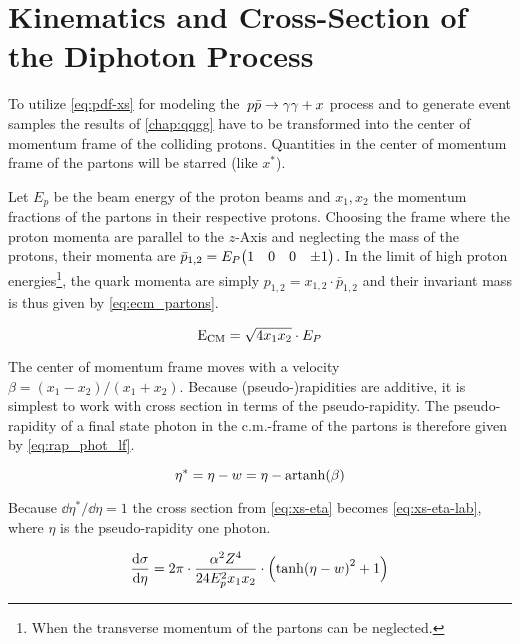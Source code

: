 \section{Kinematics and Cross-Section of the Diphoton Process}%
\label{sec:lab_xs}

To utilize \cref{eq:pdf-xs} for modeling the~\(p\bar{p}\rightarrow\gamma\gamma + x\) process and to
generate event samples the results of \cref{chap:qqgg} have to be
transformed into the center of momentum frame of the colliding
protons. Quantities in the center of momentum frame of the partons
will be starred (like \(x^\ast\)).

Let \(E_p\) be the beam energy of the proton beams and \(x_1, x_2\)
the momentum fractions of the partons in their respective protons.
Choosing the frame where the proton momenta are parallel to the
\(z\)-Axis and neglecting the mass of the protons, their momenta are
\(\bar{p}_{1,2} = E_P \mqty(1 & 0 & 0 & \pm1)\). In the limit of high
proton energies\footnote{When the transverse momentum of the partons
  can be neglected.}, the quark momenta are simply
\(p_{1,2}=x_{1,2}\cdot\bar{p}_{1,2}\) and their invariant mass is thus
given by \cref{eq:ecm_partons}.

\begin{equation}
  \label{eq:ecm_partons}
  \operatorname{E_{\text{CM}}} = \sqrt{4x_1x_2}\cdot E_P
\end{equation}

The center of momentum frame moves with a velocity
\(\beta = (x_1-x_2)/(x_1+x_2)\). Because (pseudo-)rapidities are
additive, it is simplest to work with cross section in terms of the
pseudo-rapidity.  The pseudo-rapidity of a final state photon in the
c.m.-frame of the partons is therefore given
by \cref{eq:rap_phot_lf}.

\begin{equation}
  \label{eq:rap_phot_lf}
  \eta^\ast = \eta - w = \eta - \operatorname{artanh}(\beta)
\end{equation}

Because \(\dd{\eta^\ast}/{\dd{\eta}} = 1\) the cross section
from \cref{eq:xs-eta} becomes \cref{eq:xs-eta-lab}, where \(\eta\) is
the pseudo-rapidity one photon.

\begin{equation}
  \label{eq:xs-eta-lab}
  \dv{\sigma}{\eta} = 2\pi\cdot\frac{\alpha^2Z^4}{24 E_p^2
    x_1x_2}\cdot\qty(\tanh(\eta - w)^2 + 1)
\end{equation}

